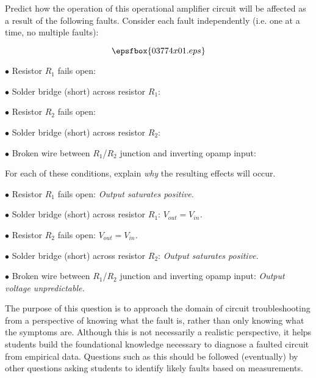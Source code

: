 

Predict how the operation of this operational amplifier circuit will be affected as a result of the following faults.  Consider each fault independently (i.e. one at a time, no multiple faults):

$$\epsfbox{03774x01.eps}$$

\medskip
\item{$\bullet$} Resistor $R_1$ fails open:
\vskip 5pt
\item{$\bullet$} Solder bridge (short) across resistor $R_1$:
\vskip 5pt
\item{$\bullet$} Resistor $R_2$ fails open:
\vskip 5pt
\item{$\bullet$} Solder bridge (short) across resistor $R_2$:
\vskip 5pt
\item{$\bullet$} Broken wire between $R_1$/$R_2$ junction and inverting opamp input:
\medskip

For each of these conditions, explain {\it why} the resulting effects will occur.







\medskip
\item{$\bullet$} Resistor $R_1$ fails open: {\it Output saturates positive.}
\vskip 5pt
\item{$\bullet$} Solder bridge (short) across resistor $R_1$: {\it $V_{out} = V_{in}$.}
\vskip 5pt
\item{$\bullet$} Resistor $R_2$ fails open: {\it $V_{out} = V_{in}$.}
\vskip 5pt
\item{$\bullet$} Solder bridge (short) across resistor $R_2$: {\it Output saturates positive.}
\vskip 5pt
\item{$\bullet$} Broken wire between $R_1$/$R_2$ junction and inverting opamp input: {\it Output voltage unpredictable.}
\medskip







The purpose of this question is to approach the domain of circuit troubleshooting from a perspective of knowing what the fault is, rather than only knowing what the symptoms are.  Although this is not necessarily a realistic perspective, it helps students build the foundational knowledge necessary to diagnose a faulted circuit from empirical data.  Questions such as this should be followed (eventually) by other questions asking students to identify likely faults based on measurements.




